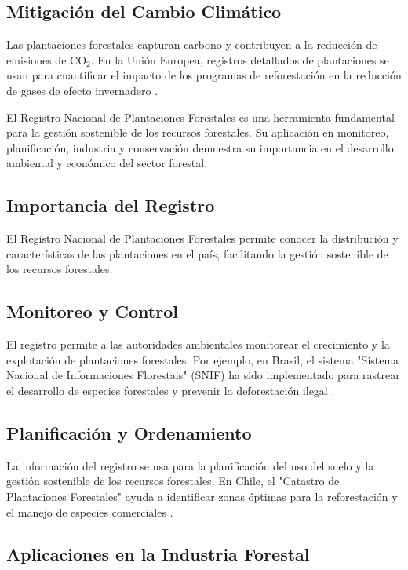 \subsection{Mitigación del Cambio Climático}
Las plantaciones forestales capturan carbono y contribuyen a la reducción de emisiones de CO$_2$. En la Unión Europea, registros detallados de plantaciones se usan para cuantificar el impacto de los programas de reforestación en la reducción de gases de efecto invernadero \cite{ueforest2022}.

El Registro Nacional de Plantaciones Forestales es una herramienta fundamental para la gestión sostenible de los recursos forestales. Su aplicación en monitoreo, planificación, industria y conservación demuestra su importancia en el desarrollo ambiental y económico del sector forestal.


\subsection{Importancia del Registro}
El Registro Nacional de Plantaciones Forestales permite conocer la distribución y características de las plantaciones en el país, facilitando la gestión sostenible de los recursos forestales.

\subsection{Monitoreo y Control}
El registro permite a las autoridades ambientales monitorear el crecimiento y la explotación de plantaciones forestales. Por ejemplo, en Brasil, el sistema "Sistema Nacional de Informaciones Florestais" (SNIF) ha sido implementado para rastrear el desarrollo de especies forestales y prevenir la deforestación ilegal \cite{snif2021}.

\subsection{Planificación y Ordenamiento}
La información del registro se usa para la planificación del uso del suelo y la gestión sostenible de los recursos forestales. En Chile, el "Catastro de Plantaciones Forestales" ayuda a identificar zonas óptimas para la reforestación y el manejo de especies comerciales \cite{catastrochile2022}.

\subsection{Aplicaciones en la Industria Forestal}
